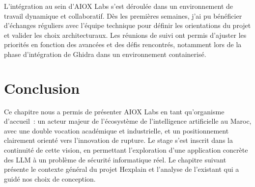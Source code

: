 L'intégration au sein d'AIOX Labs s'est déroulée dans un environnement de travail dynamique et collaboratif. Dès les premières semaines, j'ai pu bénéficier d'échanges réguliers avec l'équipe technique pour définir les orientations du projet et valider les choix architecturaux. Les réunions de suivi ont permis d'ajuster les priorités en fonction des avancées et des défis rencontrés, notamment lors de la phase d'intégration de Ghidra dans un environnement containerisé.

\section{Conclusion}

Ce chapitre nous a permis de présenter AIOX Labs en tant qu'organisme d'accueil~: un acteur majeur de l'écosystème de l'intelligence artificielle au Maroc, avec une double vocation académique et industrielle, et un positionnement clairement orienté vers l'innovation de rupture. Le stage s'est inscrit dans la continuité de cette vision, en permettant l'exploration d'une application concrète des LLM à un problème de sécurité informatique réel. Le chapitre suivant présente le contexte général du projet Hexplain et l'analyse de l'existant qui a guidé nos choix de conception.
